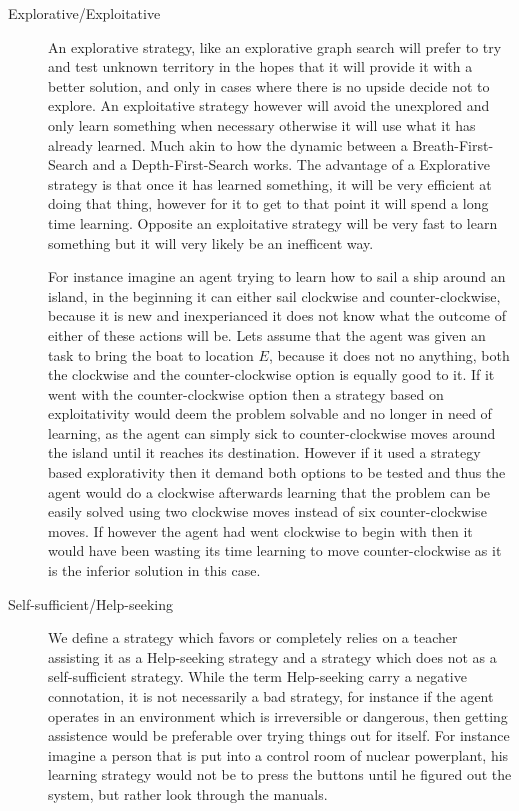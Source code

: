 \documentclass[master.tex]{subfiles}
\begin{document}
    \begin{description}
    \item [{Explorative/Exploitative}] An explorative strategy, like an explorative graph search will prefer to try and test unknown territory in the hopes that it will provide it with a better solution, and only in cases where there is no upside decide not to explore.
    An exploitative strategy however will avoid the unexplored and only learn something when necessary otherwise it will use what it has already learned. Much akin to how the dynamic between a Breath-First-Search and a Depth-First-Search works. The advantage of a Explorative strategy is that once it has learned something, it will be very efficient at doing that thing, however for it to get to that point it will spend a long time learning. Opposite an exploitative strategy will be very fast to learn something but it will very likely be an inefficent way.

    For instance imagine an agent trying to learn how to sail a ship around an island, in the beginning it can either sail clockwise and counter-clockwise, because it is new and inexperianced it does not know what the outcome of either of these actions will be. Lets assume that the agent was given an task to bring the boat to location $ E $, because it does not no anything, both the clockwise and the counter-clockwise option is equally good to it. If it went with the counter-clockwise option then a strategy based on exploitativity would deem the problem solvable and no longer in need of learning, as the agent can simply sick to counter-clockwise moves around the island until it reaches its destination. However if it used a strategy based explorativity then it demand both options to be tested and thus the agent would do a clockwise afterwards learning that the problem can be easily solved using two clockwise moves instead of six counter-clockwise moves. If however the agent had went clockwise to begin with then it would have been wasting its time learning to move counter-clockwise as it is the inferior solution in this case.
    \item [{Self-sufficient/Help-seeking}] We define a strategy which favors
    or completely relies on a teacher assisting it as a Help-seeking strategy
    and a strategy which does not as a self-sufficient strategy. While
    the term Help-seeking carry a negative connotation, it is not necessarily
    a bad strategy, for instance if the agent operates in an environment
    which is irreversible or dangerous, then getting assistence would
    be preferable over trying things out for itself. For instance imagine
    a person that is put into a control room of nuclear powerplant, his
    learning strategy would not be to press the buttons until he figured
    out the system, but rather look through the manuals.

    \end{description}
\end{document}
